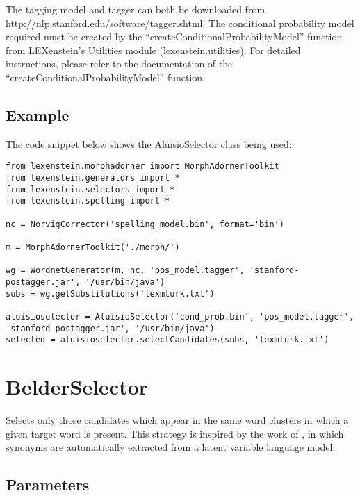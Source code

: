 The tagging model and tagger can both be downloaded from \url{http://nlp.stanford.edu/software/tagger.shtml}. The conditional probability model required must be created by the ``createConditionalProbabilityModel'' function from LEXenstein's Utilities module (lexenstein.utilities). For detailed instructions, please refer to the documentation of the ``createConditionalProbabilityModel'' function.

\subsection{Example}

The code snippet below shows the AluisioSelector class being used:

\begin{lstlisting}
from lexenstein.morphadorner import MorphAdornerToolkit
from lexenstein.generators import *
from lexenstein.selectors import *
from lexenstein.spelling import *

nc = NorvigCorrector('spelling_model.bin', format='bin')

m = MorphAdornerToolkit('./morph/')

wg = WordnetGenerator(m, nc, 'pos_model.tagger', 'stanford-postagger.jar', '/usr/bin/java')
subs = wg.getSubstitutions('lexmturk.txt')

aluisioselector = AluisioSelector('cond_prob.bin', 'pos_model.tagger', 'stanford-postagger.jar', '/usr/bin/java')
selected = aluisioselector.selectCandidates(subs, 'lexmturk.txt')
\end{lstlisting}














\section{BelderSelector}

Selects only those candidates which appear in the same word clusters in which a given target word is present. This strategy is inspired by the work of \cite{Belder2010}, in which synonyms are automatically extracted from a latent variable language model.

\subsection{Parameters}

